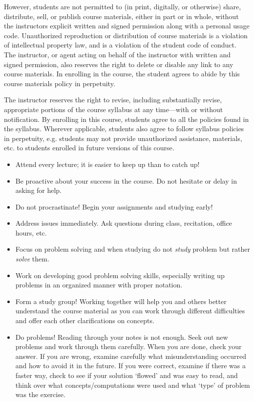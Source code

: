 \documentclass[11pt,letterpaper]{article}
\begin{document}
However, students are not permitted to (in print, digitally, or otherwise) share, distribute, sell, or publish course materials, either in part or in whole, without the instructors explicit written and signed permission along with a personal usage code. Unauthorized reproduction or distribution of course materials is a violation of intellectual property law, and is a violation of the student code of conduct. The instructor, or agent acting on behalf of the instructor with written and signed permission, also reserves the right to delete or disable any link to any course materials. In enrolling in the course, the student agrees to abide by this course materials policy in perpetuity.
\sectionbreak




The instructor reserves the right to revise, including substantially revise, appropriate portions of the course syllabus at any time---with or without notification. By enrolling in this course, students agree to all the policies found in the syllabus. Wherever applicable, students also agree to follow syllabus policies in perpetuity, e.g. students may not provide unauthorized assistance, materials, etc. to students enrolled in future versions of this course. 
\sectionbreak




\begin{itemize} \itemsep=0.3ex
\item Attend every lecture; it is easier to keep up than to catch up!
\item Be proactive about your success in the course. Do not hesitate or delay in asking for help.
\item Do not procrastinate! Begin your assignments and studying early!
\item Address issues immediately. Ask questions during class, recitation, office hours, etc. 
\item Focus on problem solving and when studying do not \textit{study} problem but rather \textit{solve} them. 
\item Work on developing good problem solving skills, especially writing up problems in an organized manner with proper notation. 
\item Form a study group! Working together will help you and others better understand the course material as you can work through different difficulties and offer each other clarifications on concepts.
\item Do problems! Reading through your notes is not enough. Seek out new problems and work through them carefully. When you are done, check your answer. If you are wrong, examine carefully what misunderstanding occurred and how to avoid it in the future. If you were correct, examine if there was a faster way, check to see if your solution `flowed' and was easy to read, and think over what concepts/computations were used and what `type' of problem was the exercise.
\end{itemize} \sectionbreak
\end{document}
